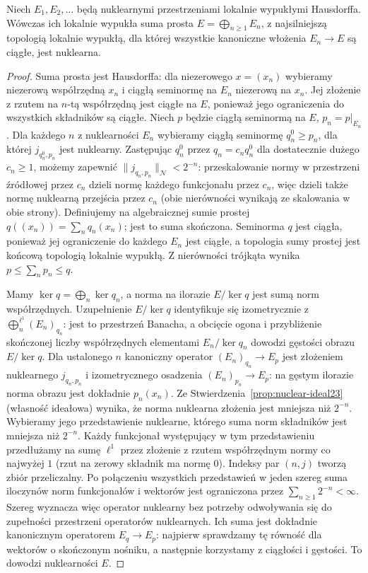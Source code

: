 \begin{lemat}
\label{lem:nuclear-direct-sum23}
Niech $E_1,E_2,\ldots$ będą nuklearnymi przestrzeniami
lokalnie wypukłymi Hausdorffa. Wówczas ich lokalnie wypukła
suma prosta $E=\bigoplus_{n\ge1}E_n$, z najsilniejszą
topologią lokalnie wypukłą, dla której wszystkie kanoniczne
włożenia $E_n\to E$ są ciągłe, jest nuklearna.
\end{lemat}
\begin{proof}
Suma prosta jest Hausdorffa: dla niezerowego
$x=(x_n)$ wybieramy niezerową współrzędną $x_n$
i ciągłą seminormę na $E_n$ niezerową na $x_n$.
Jej złożenie z rzutem na $n$-tą współrzędną jest
ciągłe na $E$, ponieważ jego ograniczenia do wszystkich
składników są ciągłe.
Niech $p$ będzie ciągłą seminormą na $E$,
$p_n=p|_{E_n}$. Dla każdego $n$ z nuklearności $E_n$
wybieramy ciągłą seminormę $q_n^0\ge p_n$, dla której
$j_{q_n^0,p_n}$ jest nuklearny. Zastępując $q_n^0$
przez $q_n=c_nq_n^0$ dla dostatecznie dużego $c_n\ge1$,
możemy zapewnić
$\|j_{q_n,p_n}\|_{\mathcal N}<2^{-n}$:
przeskalowanie normy w przestrzeni źródłowej przez
$c_n$ dzieli normę każdego funkcjonału przez $c_n$,
więc dzieli także normę nuklearną przejścia przez $c_n$
(obie nierówności wynikają ze skalowania w obie strony).
Definiujemy na algebraicznej sumie prostej
$q((x_n))=\sum_nq_n(x_n)$; jest to suma skończona.
Seminorma $q$ jest ciągła, ponieważ jej ograniczenie
do każdego $E_n$ jest ciągłe, a topologia sumy prostej
jest końcową topologią lokalnie wypukłą. Z nierówności
trójkąta wynika $p\le\sum_n p_n\le q$.

Mamy $\ker q=\bigoplus_n\ker q_n$, a norma na ilorazie
$E/\ker q$ jest sumą norm współrzędnych.
Uzupełnienie $E/\ker q$ identyfikuje się izometrycznie
z $\bigoplus_n^{\ell^1}(E_n)_{q_n}$: jest to przestrzeń
Banacha, a obcięcie ogona i przybliżenie skończonej
liczby współrzędnych elementami $E_n/\ker q_n$
dowodzi gęstości obrazu $E/\ker q$.
Dla ustalonego $n$ kanoniczny operator
$(E_n)_{q_n}\to E_p$ jest złożeniem nuklearnego
$j_{q_n,p_n}$ i izometrycznego osadzenia
$(E_n)_{p_n}\to E_p$: na gęstym ilorazie
norma obrazu jest dokładnie $p_n(x_n)$.
Ze Stwierdzenia~\ref{prop:nuclear-ideal23} (własność
ideałowa) wynika, że norma nuklearna złożenia jest
mniejsza niż $2^{-n}$.
Wybieramy jego przedstawienie nuklearne, którego suma
norm składników jest mniejsza niż $2^{-n}$.
Każdy funkcjonał występujący w tym przedstawieniu
przedłużamy na sumę $\ell^1$ przez złożenie
z rzutem współrzędnym normy co najwyżej $1$ (rzut
na zerowy składnik ma normę $0$).
Indeksy par $(n,j)$ tworzą zbiór przeliczalny.
Po połączeniu wszystkich przedstawień w jeden szereg
suma iloczynów norm funkcjonałów i wektorów jest
ograniczona przez $\sum_{n\ge1}2^{-n}<\infty$.
Szereg wyznacza więc operator nuklearny bez potrzeby
odwoływania się do zupełności przestrzeni operatorów
nuklearnych. Ich suma jest dokładnie
kanonicznym operatorem $E_q\to E_p$:
najpierw sprawdzamy tę równość dla wektorów o skończonym
nośniku, a następnie korzystamy z ciągłości i gęstości.
To dowodzi nuklearności $E$.
\end{proof}

